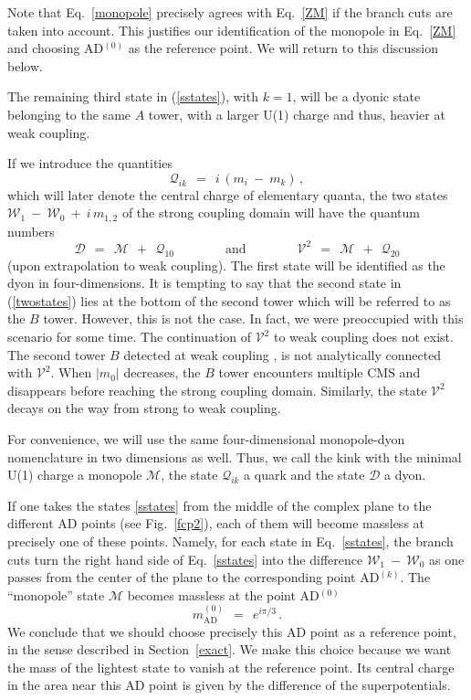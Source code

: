 \documentclass[epsfig,12pt]{article}
\def\beq{\begin{equation}}
\def\eeq{\end{equation}}
\def\beq{\begin{equation}}
\def\eeq{\end{equation}}
\newcommand{\W}{\mathcal{W}}
\newcommand{\M}{\mathcal{M}}
\newcommand{\Q}{\mathcal{Q}}
\newcommand{\D}{\mathcal{D}}
\newcommand{\V}{\mathcal{V}}
\begin{document}
	
	Note that Eq.~\eqref{monopole} precisely agrees with Eq.~\eqref{ZM} if the branch cuts are taken into account.
	This justifies our identification of the monopole in Eq.~\eqref{ZM} and choosing AD$^{(0)}$ as the reference point.
	We will return to this discussion below.
	
	The remaining third state in (\ref{sstates}), with $k=1$, will be a dyonic state belonging to the same
	$A$ tower, with a larger U(1) charge and thus, heavier at weak coupling.

	If we introduce the quantities
\beq
\label{quark}
	\Q_{ik} ~~=~~ i\, \left( m_i  ~-~ m_k \right)\,,
\eeq
	which will later denote the central charge of elementary quanta, 
	the  two states 
	$ \W_1 ~-~ \W_0 ~+~ i\, m_{1,2} $
	of the strong coupling domain will have the quantum numbers 
\beq
\label{twostates}
	\D  ~~=~~  \M ~~+~~ \Q_{10}  \qquad\qquad  \text{and}  \qquad\qquad   
	\V^2  ~~=~~  \M ~~+~~ \Q_{20}
\eeq
(upon extrapolation to weak coupling).
	The first state will be identified as the dyon in four-dimensions. It is tempting to say that
	the second state in (\ref{twostates}) lies at the bottom of the second tower which will be referred to as the
	$ B $ tower. 
	However, this is not the case. 
	In fact, we were preoccupied with this scenario for some time.
	The continuation of $ \V^2 $ to weak coupling 
	does not exist. 
	The second tower $ B $ detected at weak coupling \cite{Bolokhov:2011mp},
	is not analytically connected with $ \V^2 $.
	When $ |m_0| $ decreases, the $ B $ tower encounters multiple CMS and disappears
	before reaching the strong coupling domain.
	Similarly, the state $ \V^2 $ decays on the way from strong to weak coupling.
	
	For convenience, we will use the same four-dimensional monopole-dyon nomenclature in two dimensions as well.
	Thus, we call the kink with the minimal U(1) charge a monopole $ \M $, 
	the state $ \Q_{ik} $ a quark and the state $ \D $ a dyon.

	If one takes the states \eqref{sstates} from the middle of the complex plane to the different AD points 
	(see Fig.~\ref{fcp2}), each of them will become massless at precisely one of these points.
	Namely, for each state in Eq.~\eqref{sstates}, 
	the branch cuts turn the right hand side of Eq.~\eqref{sstates} into 
	the difference $ \W_1 ~-~ \W_0 $ as one passes from the center of the plane to the corresponding point AD$^{(k)}$.
	The ``monopole'' state $ \M $ becomes massless at the point AD$^{(0)}$
\beq
	m_\text{AD}^{(0)} ~~=~~ e^{i \pi / 3}\,.
\eeq
	We conclude that we should choose precisely this AD point as a reference point, 
	in the sense described in Section~\ref{exact}.
	We make this choice because we want the mass of the lightest state to vanish at the reference point. 
	Its central charge in the area near this AD point is given by the difference of the superpotentials.
\end{document}

